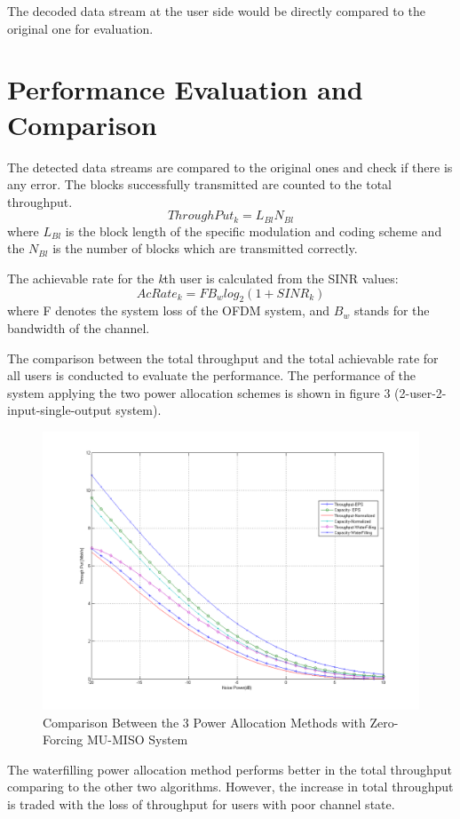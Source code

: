 \documentclass{article}
\begin{document}
\noindent
The decoded data stream at the user side would be directly compared to the original one for evaluation.


\section{Performance Evaluation and Comparison}
The detected data streams are compared to the original ones and check if there is any error. The blocks successfully transmitted are counted to the total throughput.
\[ThroughPut_k = L_{Bl}N_{Bl}\]
where $L_{Bl}$ is the block length of the specific modulation and coding scheme and the $N_{Bl}$ is the number of blocks which are transmitted correctly.

\noindent
The achievable rate for the \textit{k}th user is calculated from the SINR values:
$$AcRate_k = FB_wlog_2(1+SINR_k)$$
where F denotes the system loss of the OFDM system, and $B_w$ stands for the bandwidth of the channel.

\noindent
The comparison between the total throughput and the total achievable rate for all users is conducted to evaluate the performance.
The performance of the system applying the two power allocation schemes is shown in figure 3 (2-user-2-input-single-output system).


\begin{figure}[ht]
\centering
\includegraphics[scale=0.45]{Comparison.png}
\caption{Comparison Between the 3 Power Allocation Methods with Zero-Forcing MU-MISO System}
\label{fig:Comparison}
\end{figure}

\noindent
The waterfilling power allocation method performs better in the total throughput comparing to the other two algorithms.
However, the increase in total throughput is traded with the loss of throughput for users with poor channel state.
\end{document}
